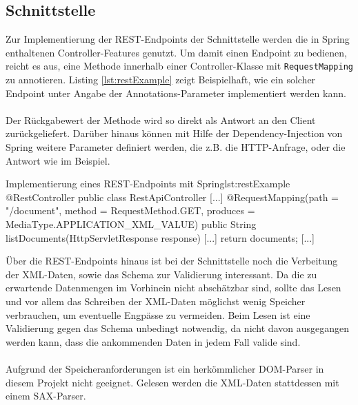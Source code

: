 \subsection{Schnittstelle}
Zur Implementierung der REST-Endpoints der Schnittstelle werden die in Spring enthaltenen
Controller-Features genutzt. Um damit einen Endpoint zu bedienen, reicht es aus,
eine Methode innerhalb einer Controller-Klasse mit \texttt{RequestMapping} zu annotieren.
Listing \ref{lst:restExample} zeigt Beispielhaft, wie ein solcher Endpoint unter Angabe der
Annotations-Parameter implementiert werden kann.
\\ \\
Der Rückgabewert der Methode wird so direkt als Antwort an den Client zurückgeliefert.
Darüber hinaus können mit Hilfe der Dependency-Injection von Spring weitere Parameter definiert werden, die z.B. die HTTP-Anfrage, oder die Antwort wie im Beispiel.
\vspace{1em}

\begin{java}{Implementierung eines REST-Endpoints mit Spring}{lst:restExample}
@RestController
public class RestApiController {
	[...]
	@RequestMapping(path = "/document", method = RequestMethod.GET, produces = MediaType.APPLICATION_XML_VALUE)
	public String listDocuments(HttpServletResponse response) {
		[...]
		return documents;
	}
	[...]
}
\end{java}

Über die REST-Endpoints hinaus ist bei der Schnittstelle noch die Verbeitung der XML-Daten,
sowie das Schema zur Validierung interessant.
Da die zu erwartende Datenmengen im Vorhinein nicht abschätzbar sind,
sollte das Lesen und vor allem das Schreiben der XML-Daten möglichst wenig Speicher
verbrauchen, um eventuelle Engpässe zu vermeiden. Beim Lesen ist eine Validierung
gegen das Schema unbedingt notwendig, da nicht davon ausgegangen werden kann,
dass die ankommenden Daten in jedem Fall valide sind.
\\ \\
Aufgrund der Speicheranforderungen ist ein herkömmlicher DOM-Parser in diesem Projekt
nicht geeignet. Gelesen werden die XML-Daten stattdessen mit einem SAX-Parser.

